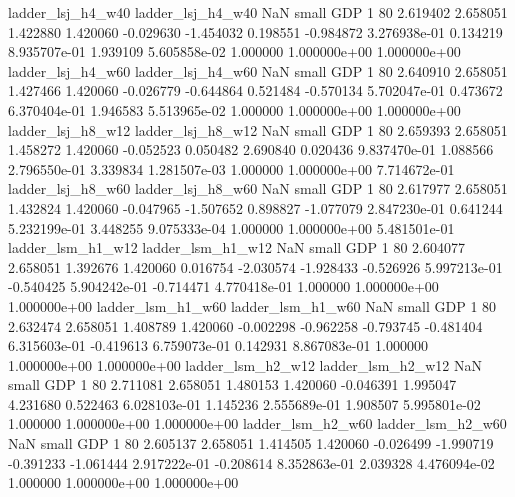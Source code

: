        ladder_lsj_h4_w40        ladder_lsj_h4_w40                   NaN      small      GDP                 1 80 2.619402       2.658051 1.422880       1.420060   -0.029630     -1.454032      0.198551    -0.984872   3.276938e-01  0.134219 8.935707e-01     1.939109   5.605858e-02            1.000000    1.000000e+00        1.000000e+00
       ladder_lsj_h4_w60        ladder_lsj_h4_w60                   NaN      small      GDP                 1 80 2.640910       2.658051 1.427466       1.420060   -0.026779     -0.644864      0.521484    -0.570134   5.702047e-01  0.473672 6.370404e-01     1.946583   5.513965e-02            1.000000    1.000000e+00        1.000000e+00
       ladder_lsj_h8_w12        ladder_lsj_h8_w12                   NaN      small      GDP                 1 80 2.659393       2.658051 1.458272       1.420060   -0.052523      0.050482      2.690840     0.020436   9.837470e-01  1.088566 2.796550e-01     3.339834   1.281507e-03            1.000000    1.000000e+00        7.714672e-01
       ladder_lsj_h8_w60        ladder_lsj_h8_w60                   NaN      small      GDP                 1 80 2.617977       2.658051 1.432824       1.420060   -0.047965     -1.507652      0.898827    -1.077079   2.847230e-01  0.641244 5.232199e-01     3.448255   9.075333e-04            1.000000    1.000000e+00        5.481501e-01
       ladder_lsm_h1_w12        ladder_lsm_h1_w12                   NaN      small      GDP                 1 80 2.604077       2.658051 1.392676       1.420060    0.016754     -2.030574     -1.928433    -0.526926   5.997213e-01 -0.540425 5.904242e-01    -0.714471   4.770418e-01            1.000000    1.000000e+00        1.000000e+00
       ladder_lsm_h1_w60        ladder_lsm_h1_w60                   NaN      small      GDP                 1 80 2.632474       2.658051 1.408789       1.420060   -0.002298     -0.962258     -0.793745    -0.481404   6.315603e-01 -0.419613 6.759073e-01     0.142931   8.867083e-01            1.000000    1.000000e+00        1.000000e+00
       ladder_lsm_h2_w12        ladder_lsm_h2_w12                   NaN      small      GDP                 1 80 2.711081       2.658051 1.480153       1.420060   -0.046391      1.995047      4.231680     0.522463   6.028103e-01  1.145236 2.555689e-01     1.908507   5.995801e-02            1.000000    1.000000e+00        1.000000e+00
       ladder_lsm_h2_w60        ladder_lsm_h2_w60                   NaN      small      GDP                 1 80 2.605137       2.658051 1.414505       1.420060   -0.026499     -1.990719     -0.391233    -1.061444   2.917222e-01 -0.208614 8.352863e-01     2.039328   4.476094e-02            1.000000    1.000000e+00        1.000000e+00
